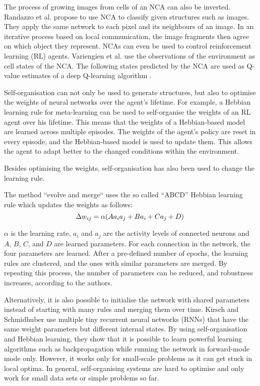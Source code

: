 The process of growing images from cells of an NCA can also be inverted.
Randazzo et al.  propose to use NCA to classify given structures such as images.
They apply the same network to each pixel and its neighbours of an image.
In an iterative process based on local communication, the image fragments then agree on which object they represent.
NCAs can even be used to control reinforcement learning (RL) agents.
Variengien et al.  use the observations of the environment as cell states of the NCA. The following states predicted by the NCA are used as Q-value estimates of a deep Q-learning algorithm .

Self-organisation can not only be used to generate structures, but also to optimise the weights of neural networks over the agent's lifetime.
For example, a Hebbian learning rule for meta-learning can be used to self-organise the weights of an RL agent over his lifetime.
This means that the weights of a Hebbian-based model are learned across multiple episodes.
The weights of the agent's policy are reset in every episode, and the Hebbian-based model is used to update them.
This allows the agent to adapt better to the changed conditions within the environment.

Besides optimising the weights, self-organisation has also been used to change the learning rule.

The method ``evolve and merge``  uses the so called ``ABCD'' Hebbian learning rule which updates the weights as follows:
\begin{equation}\eqlbl{McCulloch_Pitts_act}
	\Delta w_{ij} = \alpha (A a_i a_j + B a_i + C a_j + D)
\end{equation}%

$\alpha$ is the learning rate, $a_i$ and $a_j$ are the activity levels of connected neurons and $A$, $B$, $C$, and $D$ are learned parameters.
For each connection in the network, the four parameters are learned.
After a pre-defined number of epochs, the learning rules are clustered, and the ones with similar parameters are merged.
By repeating this process, the number of parameters can be reduced, and robustness increases, according to the authors.

Alternatively, it is also possible to initialise the network with shared parameters instead of starting with many rules and merging them over time.
Kirsch and Schmidhuber  use multiple tiny recurrent neural networks (RNNs) that have the same weight parameters but different internal states.
By using self-organisation and Hebbian learning, they show that it is possible to learn powerful learning algorithms such as backpropagation while running the network in forward-mode mode only.
However, it works only for small-scale problems as it can get stuck in local optima.
In general, self-organising systems are hard to optimise and only work for small data sets or simple problems so far.

